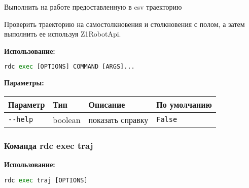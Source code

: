 Выполнить на работе предоставленную в csv траекторию

Проверить траекторию на самостолкновения и столкновения с полом, а затем выполнить ее используя Z1RobotApi.

\textbf{Использование:}
\begin{lstlisting}[language=python, numbers=none, frame=single]
rdc exec [OPTIONS] COMMAND [ARGS]...
\end{lstlisting}

\textbf{Параметры:}
\begin{center}
\fontsize{10pt}{10pt}\selectfont
\begin{longtable}[]{p{5cm}|p{2cm}|p{3.5cm}|p{5cm}}
    \hline
\toprule()
Параметр & Тип & Описание & По умолчанию \\
\hline
\midrule()
\endhead
\texttt{-\/-help} & boolean & показать справку &
\texttt{False} \\
\bottomrule()
\hline
\end{longtable}
\end{center}

\hypertarget{rdc-exec-traj}{%
\subsubsection{Команда rdc exec traj}\label{rdc-exec-traj}}

\textbf{Использование:}
\begin{lstlisting}[language=python, numbers=none, frame=single]
rdc exec traj [OPTIONS]
\end{lstlisting}

